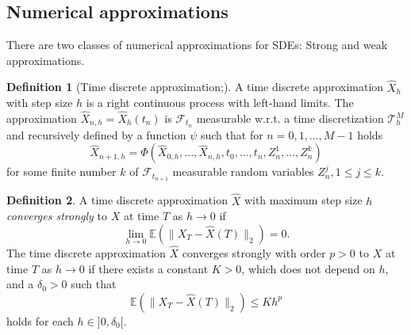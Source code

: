 \documentclass[12pt]{article}
\theoremstyle{definition}
\newtheorem{definition}[definition]{Definition}
\numberwithin{equation}{section}
\newcommand{\norm}[1]{\lVert{#1}\rVert_2}
\begin{document}
\subsection{Numerical approximations}
\label{subsec:SdeNumericalMethods}
There are two classes of numerical approximations for SDEs: Strong and weak approximations. 
\begin{definition}[Time discrete approximation;]
  A time discrete approximation $\widehat{X}_h$ with step size $h$ is a right continuous process with left-hand limits. The approximation $\widehat{X}_{n,h} = \widehat{X}_h(t_n)$ is $\mathcal{F}_{t_n}$ measurable w.r.t. a time discretization $\mathcal{T}^M_h$ and recursively defined by a function $\psi$ such that for $n=0,1,\dots,M-1$ holds
  \begin{equation}
    \widehat{X}_{n+1, h} = \Phi(\widehat{X}_{0,h}, \dots, \widehat{X}_{n,h}, t_0, \dots, t_n, Z^1_n,\dots, Z_n^k)
  \end{equation}
  for some finite number $k$ of $\mathcal{F}_{t_{n+1}}$ measurable random variables $Z^j_n, 1 \leq j \leq k$.
\end{definition}
\begin{definition}
  A time discrete approximation $\widehat{X}$ with maximum step size $h$ \emph{converges strongly} to $X$ at time $T$ as $h \rightarrow 0$ if 
  \begin{equation}
    \lim_{h \rightarrow 0} \mathbb{E}(\norm{X_T - \widehat{X}(T)}) = 0.
  \end{equation}
  The time discrete approximation $\widehat{X}$ converges strongly with order $p>0$ to $X$ at time $T$ as $h \rightarrow 0$ if there exists a constant $K > 0$, which does not depend on $h$, and a $\delta_0 > 0$ such that 
  \begin{equation}
    \mathbb{E}(\norm{X_T - \widehat{X}(T)}) \leq K h^p
  \end{equation}
  holds for each $h \in ]0, \delta_0[$.
\end{definition}
\end{document}
